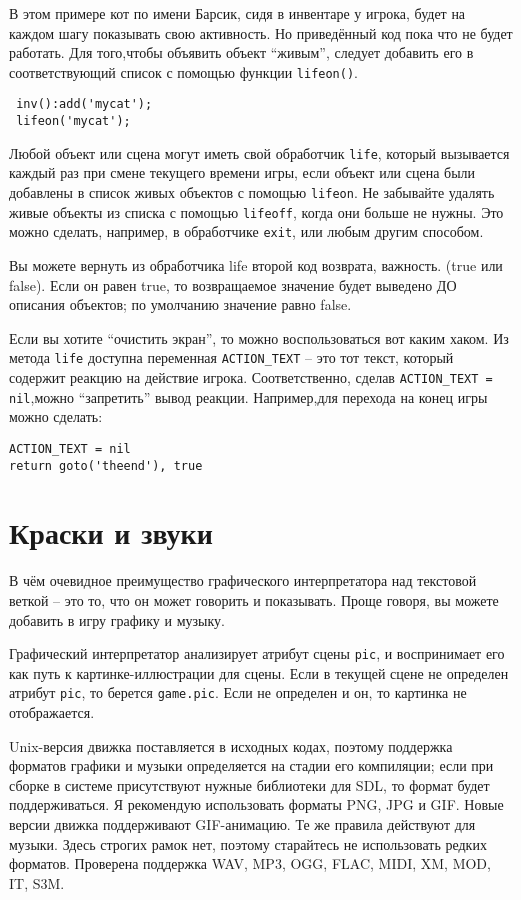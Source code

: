 \documentclass[a4paper,12pt]{article}
\begin{document}
В этом примере кот по имени Барсик, сидя в инвентаре у игрока, будет на каждом шагу показывать свою активность. Но приведённый код пока что не будет работать. Для того,чтобы объявить объект ``живым'', следует добавить его в соответствующий список с помощью функции \verb/lifeon()/. 

\begin{verbatim}
 inv():add('mycat');
 lifeon('mycat');
\end{verbatim}

Любой объект или сцена могут иметь свой обработчик \verb/life/, который вызывается каждый раз при смене текущего времени игры, если объект или сцена были добавлены в список живых объектов с помощью \verb/lifeon/. Не забывайте удалять живые объекты из списка с помощью \verb/lifeoff/, когда они больше не нужны. Это можно сделать, например, в обработчике \verb/exit/, или любым другим способом.

Вы можете вернуть из обработчика life второй код возврата, важность. (true или false). Если он равен true, то возвращаемое значение будет выведено ДО описания объектов; по умолчанию значение равно false.

Если вы хотите ``очистить экран'', то можно воспользоваться вот каким хаком. Из метода \verb/life/ доступна переменная \verb/ACTION_TEXT/ -- это тот текст, который содержит реакцию на действие игрока. Соответственно, сделав \verb/ACTION_TEXT = nil/,можно ``запретить'' вывод реакции. Например,для перехода на конец игры можно сделать:

\begin{verbatim}
ACTION_TEXT = nil
return goto('theend'), true
\end{verbatim}

\section{Краски и звуки}

В чём очевидное преимущество графического интерпретатора над текстовой веткой -- это то, что он может говорить и показывать. Проще говоря, вы можете добавить в игру графику и музыку.

Графический интерпретатор анализирует атрибут сцены \verb/pic/, и воспринимает его как путь к картинке-иллюстрации для сцены. Если в текущей сцене не определен атрибут \verb/pic/, то берется \verb/game.pic/. Если не определен и он, то картинка не отображается.

Unix-версия движка поставляется в исходных кодах, поэтому поддержка форматов графики и музыки определяется на стадии его компиляции; если при сборке в системе присутствуют нужные библиотеки для SDL, то формат будет поддерживаться. Я рекомендую использовать форматы PNG, JPG и GIF. Новые версии движка поддерживают GIF-анимацию. Те же правила действуют для музыки. Здесь строгих рамок нет, поэтому старайтесь не использовать редких форматов. Проверена поддержка WAV, MP3, OGG, FLAC, MIDI, XM, MOD, IT, S3M.
\end{document}
